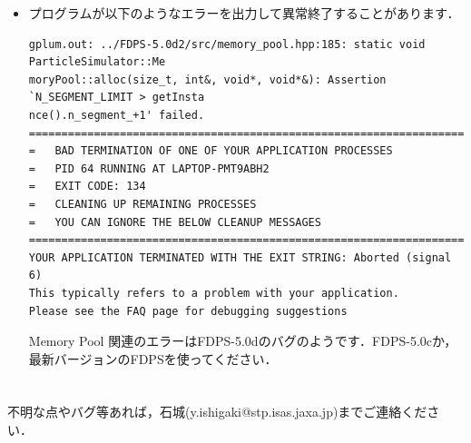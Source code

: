 \documentclass[12pt,a4paper,dvipdfmx]{jsarticle}
\begin{document}
\begin{itemize}
\item
プログラムが以下のようなエラーを出力して異常終了することがあります．
\begin{verbatim}
gplum.out: ../FDPS-5.0d2/src/memory_pool.hpp:185: static void ParticleSimulator::Me
moryPool::alloc(size_t, int&, void*, void*&): Assertion `N_SEGMENT_LIMIT > getInsta
nce().n_segment_+1' failed.
===================================================================================
=   BAD TERMINATION OF ONE OF YOUR APPLICATION PROCESSES
=   PID 64 RUNNING AT LAPTOP-PMT9ABH2
=   EXIT CODE: 134
=   CLEANING UP REMAINING PROCESSES
=   YOU CAN IGNORE THE BELOW CLEANUP MESSAGES
===================================================================================
YOUR APPLICATION TERMINATED WITH THE EXIT STRING: Aborted (signal 6)
This typically refers to a problem with your application.
Please see the FAQ page for debugging suggestions
\end{verbatim}

Memory Pool 関連のエラーはFDPS-5.0dのバグのようです．FDPS-5.0cか，最新バージョンのFDPSを使ってください．

\end{itemize}



\section*{}

不明な点やバグ等あれば，石城(y.ishigaki@stp.isas.jaxa.jp)までご連絡ください．
\end{document}
